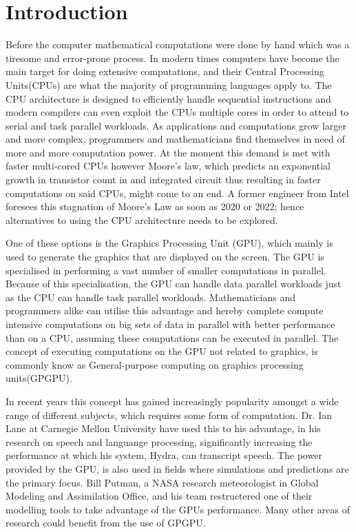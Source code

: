 \chapter{Introduction} %
\label{cha:introduction}
Before the computer mathematical computations were done by hand which was a tiresome and error-prone process.
In modern times computers have become the main target for doing extensive computations, and their Central Processing Units(CPUs) are what the majority of programming languages apply to.
The CPU architecture is designed to efficiently handle sequential instructions and modern compilers can even exploit the CPUs multiple cores in order to attend to serial and task parallel workloads.
As applications and computations grow larger and more complex, programmers and mathematicians find themselves in need of more and more computation power.\citep[pp. 4]{OpenCL_AMD}
At the moment this demand is met with faster multi-cored CPUs however Moore's law, which predicts an exponential growth in transistor count in and integrated circuit thus resulting in faster computations on said CPUs, might come to an end.
A former engineer from Intel foresees this stagnation of Moore's Law as soon as 2020 or 2022; hence alternatives to using the CPU architecture needs to be explored. \citep{Moore2013}

One of these options is the Graphics Processing Unit (GPU), which mainly is used to generate the graphics that are displayed on the screen.
The GPU is specialised in performing a vast number of smaller computations in parallel.
Because of this specialisation, the GPU can handle data parallel workloads just as the CPU can handle task parallel workloads.
Mathematicians and programmers alike can utilise this advantage and hereby complete compute intensive computations on big sets of data in parallel with better performance than on a CPU, assuming these computations can be executed in parallel.
The concept of executing computations on the GPU not related to graphics, is commonly know as General-purpose computing on graphics processing units(GPGPU).

In recent years this concept has gained increasingly popularity amongst a wide range of different subjects, which requires some form of computation.
Dr. Ian Lane at Carnegie Mellon University have used this to his advantage, in his research on speech and languange processing, significantly increasing the performance at which his system, Hydra, can transcript speech.\citep{NvidiaSpotlightIan}
The power provided by the GPU, is also used in fields where simulations and predictions are the primary focus. 
Bill Putman, a NASA research meteorologist in Global Modeling and Assimilation Office, and his team restructered one of their modelling tools to take advantage of the GPUs performance.\citep{NvidiaSpotlightNasa}
Many other areas of research could benefit from the use of GPGPU.

